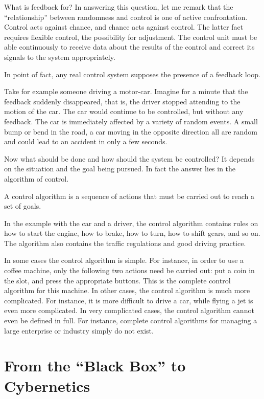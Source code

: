 What is feedback for? In answering this question, let me remark that
the ``relationship'' between randomness and control is one of active
confrontation. Control acts against chance, and chance acts against
control. The latter fact requires flexible control, the possibility for
adjustment. The control unit must be able continuously to receive data
about the results of the control and correct its signals to the system
appropriately.

In point of fact, any real control system supposes the presence of
a feedback loop. 

Take for example someone driving a motor-car. Imagine for a minute
that the feedback suddenly disappeared, that is, the driver stopped
attending to the motion of the car. The car would continue to be
controlled, but without any feedback. The car is immediately affected by
a variety of random events. A small bump or bend in the road, a car
moving in the opposite direction all are random and could lead to an
accident in only a few seconds.

 Now what should be done and how should the system be controlled? It depends on the situation and the goal being
pursued. In fact the answer lies in the algorithm of control. 
\begin{mybox}{}
A control algorithm is a sequence of actions that must be carried out to reach a set of goals.
\end{mybox}

In the example with the car and a driver, the control algorithm
contains rules on how to start the engine, how to brake, how to turn,
how to shift gears, and so on. The algorithm also contains the traffic
regulations and good driving practice.

In some cases the control algorithm is simple. For instance, in order
to use a coffee machine, only the following two actions need be carried
out: put a coin in the slot, and press the appropriate buttons. This is the
complete control algorithm for this machine. In other cases, the control
algorithm is much more complicated. For instance, it is more difficult to
drive a car, while flying a jet is even more complicated. In very
complicated cases, the control algorithm cannot even be defined in full.
For instance, complete control algorithms for managing a large
enterprise or industry simply do not exist.

\section{From the ``Black Box'' to Cybernetics}

